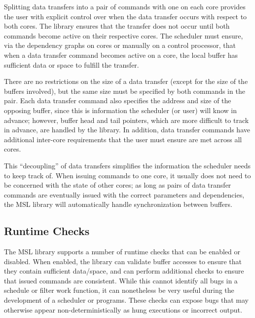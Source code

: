 Splitting data transfers into a pair of commands with one on each
core provides the user with explicit control over when the data
transfer occurs with respect to both cores. The library ensures
that the transfer does not occur until both commands become active on
their respective cores. The scheduler must ensure, via the
dependency graphs on cores or manually on a control processor, that
when a data transfer command becomes active on a core, the local
buffer has sufficient data or space to fulfill the transfer.


There are no restrictions on the size of a data transfer (except for
the size of the buffers involved), but the same size must be specified
by both commands in the pair. Each data transfer command also
specifies the address and size of the opposing buffer, since this is
information the scheduler (or user) will know in advance; however,
buffer head and tail pointers, which are more difficult to track in
advance, are handled by the library. In addition, data transfer
commands have additional inter-core requirements that the user must
ensure are met across all cores.

This ``decoupling'' of data transfers simplifies the information the
scheduler needs to keep track of. When issuing commands to one core,
it usually does not need to be concerned with the state of other
cores; as long as pairs of data transfer commands are eventually
issued with the correct parameters and dependencies, the MSL library
will automatically handle synchronization between buffers.

\subsection{Runtime Checks}

The MSL library supports a number of runtime checks that can be
enabled or disabled. When enabled, the library can validate buffer
accesses to ensure that they contain sufficient data/space, and can
perform additional checks to ensure that issued commands are
consistent. While this cannot identify all bugs in a schedule or
filter work function, it can nonetheless be very useful during the
development of a scheduler or programs. These checks can expose bugs that may otherwise appear
non-deterministically as hung executions or incorrect output.

